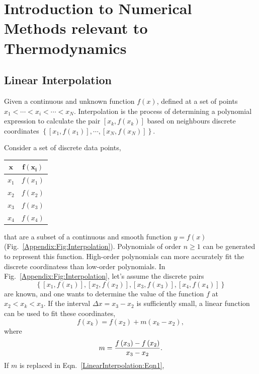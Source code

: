 
\chapter{Introduction to Numerical Methods relevant to Thermodynamics}\label{Appendix_NumMethods}

\section{Linear Interpolation}\label{LinearInterpolation}

Given a continuous and unknown function $f(x)$, defined at a set of points  $x_{1} < \cdots < x_{i} < \cdots < x_{N}$. Interpolation is the process of determining a polynomial expression to calculate the pair $\left[x_{k}, f\left(x_{k}\right)\right]$ based on neighbours discrete coordinates $\left\{\left[x_{1},f\left(x_{1}\right)\right], \cdots, \left[x_{N},f\left(x_{N}\right)\right]\right\}$. 

Consider a set of discrete data points,
  \begin{center}
    \begin{tabular}{c | c }
        $\mathbf{x}$   & $\mathbf{f\left(x_{i}\right)}$ \\
        \hline
           $x_{1}$ &  $f\left(x_{1}\right)$ \\
           $x_{2}$ &  $f\left(x_{2}\right)$ \\
           $x_{3}$ &  $f\left(x_{3}\right)$ \\
           $x_{4}$ &  $f\left(x_{4}\right)$ \\
    \end{tabular}
  \end{center}
that are a subset of a continuous and smooth function $y=f(x)$ (Fig.~\ref{Appendix:Fig:Interpolation}). Polynomials of order $n\ge 1$ can be generated to represent this function. High-order polynomials can more accurately fit the discrete coordinatess than low-order polynomials. In Fig.~\ref{Appendix:Fig:Interpolation}, let's assume the discrete pairs 
  \begin{displaymath}
     \left\{\left[x_{1},f\left(x_{1}\right)\right], \left[x_{2},f\left(x_{2}\right)\right],\left[x_{3},f\left(x_{3}\right)\right], \left[x_{4},f\left(x_{4}\right)\right]\right\}
  \end{displaymath}
are known, and one wants to determine the value of the function $f$ at $x_{2} < x_{k} < x_{3}$. If the interval $\Delta x= x_{3}-x_{2}$ is sufficiently small, a linear function can be used to fit these coordinates,
   \begin{equation}
       f\left(x_{k}\right) = f\left(x_{2}\right) + m\left(x_{k}-x_{2}\right),\label{LinearInterpolation:Eqn1}
   \end{equation}
where 
   \begin{displaymath}
      m = \displaystyle\frac{f\left(x_{3}\right)-f\left(x_{2}\right)}{x_{3}-x_{2}}.
   \end{displaymath}
If $m$ is replaced in Eqn.~\ref{LinearInterpolation:Eqn1},


